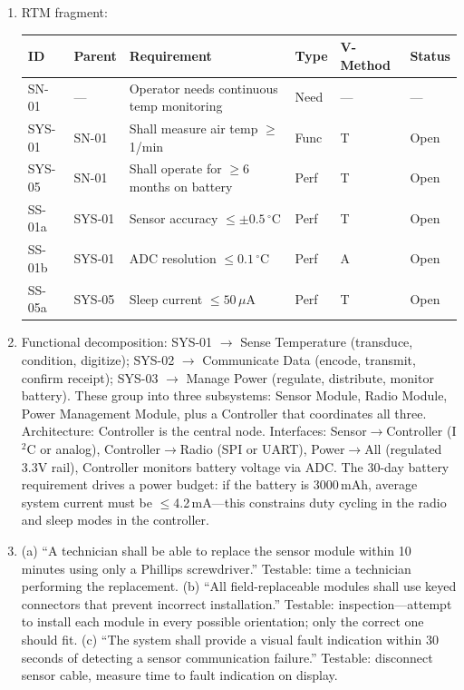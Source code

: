 \documentclass[11pt,letterpaper,twoside,openany]{book}
\newcommand{\degC}{\ensuremath{{}^{\circ}\text{C}}}
\begin{document}
\begin{enumerate}[leftmargin=1.5em]
\item RTM fragment:
\begin{center}\small
\begin{tabularx}{\textwidth}{l l X l l l}
\toprule
\textbf{ID} & \textbf{Parent} & \textbf{Requirement} & \textbf{Type} & \textbf{V-Method} & \textbf{Status} \\
\midrule
SN-01 & --- & Operator needs continuous temp monitoring & Need & --- & --- \\
SYS-01 & SN-01 & Shall measure air temp $\geq$1/min & Func & T & Open \\
SYS-05 & SN-01 & Shall operate for $\geq$6 months on battery & Perf & T & Open \\
SS-01a & SYS-01 & Sensor accuracy $\leq \pm 0.5$\,\degC & Perf & T & Open \\
SS-01b & SYS-01 & ADC resolution $\leq 0.1$\,\degC & Perf & A & Open \\
SS-05a & SYS-05 & Sleep current $\leq 50$\,$\mu$A & Perf & T & Open \\
\bottomrule
\end{tabularx}
\end{center}

\item Functional decomposition: SYS-01 $\to$ Sense Temperature (transduce, condition, digitize); SYS-02 $\to$ Communicate Data (encode, transmit, confirm receipt); SYS-03 $\to$ Manage Power (regulate, distribute, monitor battery). These group into three subsystems: Sensor Module, Radio Module, Power Management Module, plus a Controller that coordinates all three. Architecture: Controller is the central node. Interfaces: Sensor$\to$Controller (I$^2$C or analog), Controller$\to$Radio (SPI or UART), Power$\to$All (regulated 3.3V rail), Controller monitors battery voltage via ADC. The 30-day battery requirement drives a power budget: if the battery is 3000\,mAh, average system current must be $\leq$4.2\,mA---this constrains duty cycling in the radio and sleep modes in the controller.

\item (a) ``A technician shall be able to replace the sensor module within 10 minutes using only a Phillips screwdriver.'' Testable: time a technician performing the replacement. (b) ``All field-replaceable modules shall use keyed connectors that prevent incorrect installation.'' Testable: inspection---attempt to install each module in every possible orientation; only the correct one should fit. (c) ``The system shall provide a visual fault indication within 30 seconds of detecting a sensor communication failure.'' Testable: disconnect sensor cable, measure time to fault indication on display.
\end{enumerate}
\end{document}
